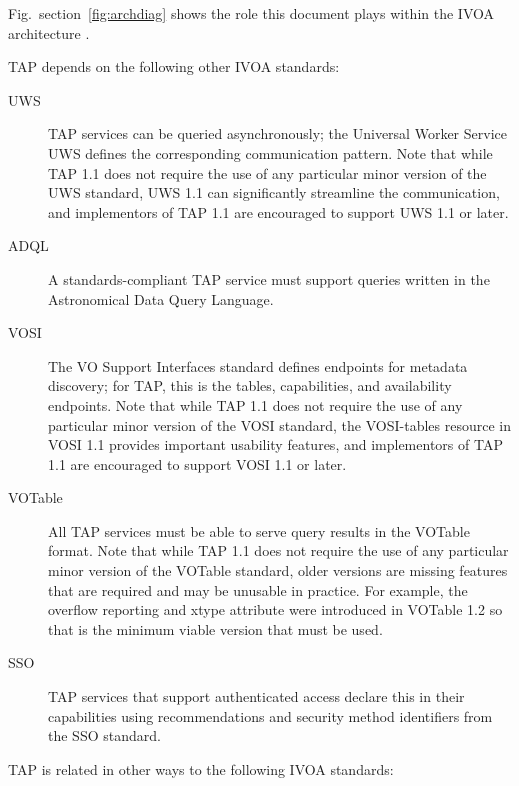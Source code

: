 \documentclass[11pt,letter]{ivoa}
\begin{document}
Fig.~section~\ref{fig:archdiag} shows the role this document plays within the
IVOA architecture \citep{note:VOARCH}.

TAP depends on the following other IVOA standards:

\begin{description}

\item[UWS \citep{2016ivoa.spec.1024H}] TAP services can be queried
asynchronously; the Universal Worker Service UWS defines the
corresponding communication pattern.  Note that while TAP 1.1 does not
require the use of any particular minor version of the UWS standard, 
UWS 1.1 can significantly streamline the communication, and
implementors of TAP 1.1 are encouraged to support UWS 1.1 or later.

\item[ADQL \citep{2008ivoa.spec.1030O}] A standards-compliant TAP
service must support queries written in the Astronomical Data Query
Language.

\item[VOSI \citep{2017ivoa.spec.0524G}] The VO Support Interfaces standard
defines endpoints for metadata discovery; for TAP, this is the tables,
capabilities, and availability endpoints. Note that while TAP 1.1 does not
require the use of any particular minor version of the VOSI standard, 
the VOSI-tables resource in VOSI 1.1 provides important usability features, and
implementors of TAP 1.1 are encouraged to support VOSI 1.1 or later.

\item[VOTable \citep{2013ivoa.spec.0920O}] All TAP services must be able
to serve query results in the VOTable format. Note that while TAP 1.1 does not
require the use of any particular minor version of the VOTable standard, older 
versions are missing features that are required and may be unusable in practice.
For example, the overflow reporting and xtype attribute were introduced in 
VOTable 1.2 so that is the minimum viable version that must be used.

\item[SSO \citep{std:SSOAUTH2}] TAP services that support authenticated 
access declare this in their capabilities using recommendations and security method 
identifiers from the SSO standard.
\end{description}


TAP is related in other ways to the following IVOA standards:
\end{document}

